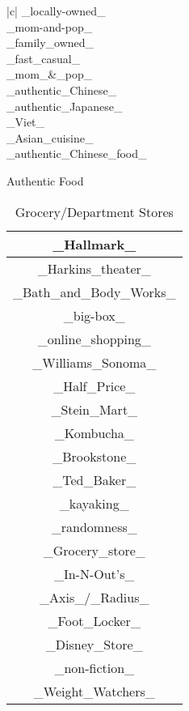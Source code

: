 \documentclass{article}
\begin{document}
\begin{table}[ht]
{\begin{tabular}{|c|}
    \_locally-owned\_\\
    \hline
    \_mom-and-pop\_\\
    \hline
    \_family\_owned\_\\
    \hline
    \_fast\_casual\_\\
    \hline
    \_mom\_&\_pop\_\\
    \hline
    \_authentic\_Chinese\_\\
    \hline
    \_authentic\_Japanese\_\\
    \hline
    \_Viet\_\\
    \hline
    \_Asian\_cuisine\_\\
    \hline
    \_authentic\_Chinese\_food\_\\
    \hline
    \end{tabular}
    \caption{Authentic Food}
    }
    \hfill
    \parbox{.2\linewidth}{
    \centering
    \begin{tabular}{|c|}
    \hline
    \_Hallmark\_\\
    \hline
    \_Harkins\_theater\_\\
    \hline
    \_Bath\_and\_Body\_Works\_\\
    \hline
    \_big-box\_\\
    \hline
    \_online\_shopping\_\\
    \hline
    \_Williams\_Sonoma\_\\
    \hline
    \_Half\_Price\_\\
    \hline
    \_Stein\_Mart\_\\
    \hline
    \_Kombucha\_\\
    \hline
    \_Brookstone\_\\
    \hline
    \_Ted\_Baker\_\\
    \hline
    \_kayaking\_\\
    \hline
    \_randomness\_\\
    \hline
    \_Grocery\_store\_\\
    \hline
    \_In-N-Out's\_\\
    \hline
    \_Axis\_/\_Radius\_\\
    \hline
    \_Foot\_Locker\_\\
    \hline
    \_Disney\_Store\_\\
    \hline
    \_non-fiction\_\\
    \hline
    \_Weight\_Watchers\_\\
    \hline
    \end{tabular}
    \caption{Grocery/Department Stores}
    }
\end{table}\\
\end{document}
